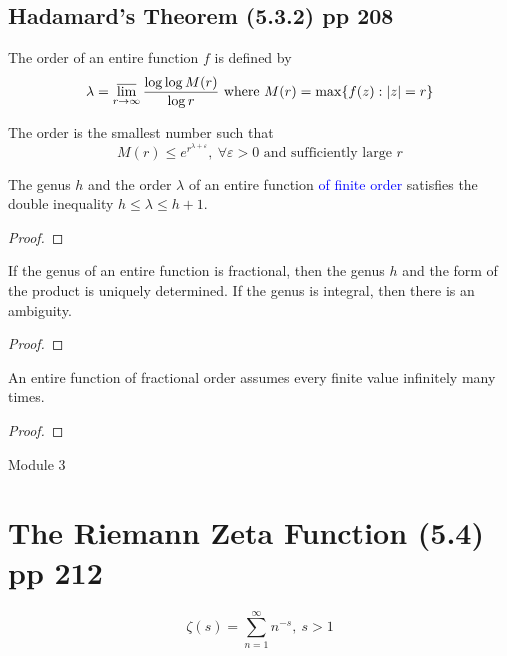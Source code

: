 \subsection{Hadamard's Theorem (5.3.2) pp 208}
\begin{definition}[Order]
	The order of an entire function $f$ is defined by
	\begin{equation}
		\lambda = \varlimsup_{r \to \infty} \frac{\log \log M(r)}{\log r} \text{ where } M(r) = \max \{ f(z) : |z| = r\}
	\end{equation}
\end{definition}
\begin{remark}
	The order is the smallest number such that
	\begin{equation}
		M(r) \le e^{r^{\lambda+\varepsilon}},\ \forall \varepsilon > 0 \text{ and sufficiently large } r
	\end{equation}
\end{remark}

\begin{theorem}
	The genus $h$ and the order $\lambda$ of an entire function \textcolor{blue}{of finite order} satisfies the double inequality $h \le \lambda \le h+1$.
\end{theorem}
\begin{proof}
\end{proof}

\begin{remark}
	If the genus of an entire function is fractional, then the genus $h$ and the form of the product is uniquely determined.
	If the genus is integral, then there is an ambiguity.
\end{remark}
\begin{proof}
\end{proof}

\begin{corollary}
	An entire function of fractional order assumes every finite value infinitely many times.
\end{corollary}
\begin{proof}
\end{proof}

\pagebreak
{\Large Module 3}
\section{The Riemann Zeta Function (5.4) pp 212}
\begin{definition}
\begin{equation}
	\zeta(s) = \sum_{n=1}^\infty n^{-s},\ s > 1
\end{equation}
\end{definition}

